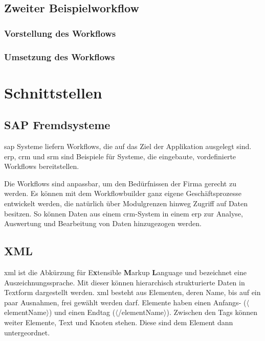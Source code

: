 \subsection{Zweiter Beispielworkflow}
\label{sec:builder-2-bsp}

\subsubsection{Vorstellung des Workflows}
\label{sec:builder-2-bsp-vorstellung}

\subsubsection{Umsetzung des Workflows}
\label{sec:builder-2-bsp-umsetzung}

\section{Schnittstellen}

\subsection{SAP Fremdsysteme}
\label{sec:export-sap}

\gls{sap} Systeme liefern Workflows, die auf das Ziel der Applikation ausgelegt sind. \gls{erp}, \gls{crm} und \gls{srm} sind Beispiele für Systeme, die eingebaute, vordefinierte Workflows bereitstellen. 

Die Workflows sind anpassbar, um den Bedürfnissen der Firma gerecht zu werden. Es können mit dem Workflowbuilder ganz eigene Geschäftsprozesse entwickelt werden, die natürlich über Modulgrenzen hinweg Zugriff auf Daten besitzen. So können Daten aus einem \gls{crm}-System in einem \gls{erp} zur Analyse, Auswertung und Bearbeitung von Daten hinzugezogen werden.

\subsection{XML}
\label{sec:export-xml}

\gls{xml} ist die Abkürzung für E\textbf{x}tensible \textbf{M}arkup \textbf{L}anguage und bezeichnet eine Auszeichnungssprache. Mit dieser können hierarchisch strukturierte Daten in Textform dargestellt werden. \gls{xml} besteht aus Elementen, deren Name, bis auf ein paar Ausnahmen, frei gewählt werden darf. Elemente haben einen Anfangs- ($\langle$elementName$\rangle$) und einen Endtag ($\langle$/elementName$\rangle$). Zwischen den Tags können weiter Elemente, Text und Knoten stehen. Diese sind dem Element dann untergeordnet.


